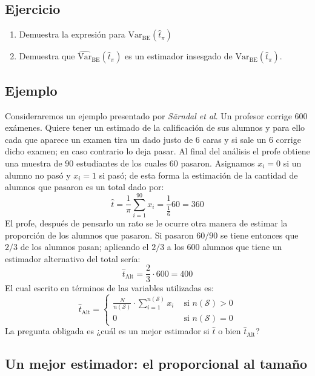 \documentclass[
]{book}
\begin{document}
\hypertarget{ejercicio-8}{%
\subsection{Ejercicio}\label{ejercicio-8}}

\begin{enumerate}
\def\labelenumi{\arabic{enumi}.}
\item
  Demuestra la expresión para \(\textrm{Var}_{\text{BE}}(\hat{t}_{\pi})\)
\item
  Demuestra que \(\widehat{\textrm{Var}}_{\text{BE}}(\hat{t}_{\pi})\) es un estimador insesgado de \(\textrm{Var}_{\text{BE}}(\hat{t}_{\pi})\).
\end{enumerate}

\hypertarget{ejemplo-1}{%
\subsection{Ejemplo}\label{ejemplo-1}}

Consideraremos un ejemplo presentado por \emph{Särndal et al}. Un profesor corrige 600 exámenes. Quiere tener un estimado de la calificación de sus alumnos y para ello cada que aparece un examen tira un dado justo de \(6\) caras y si sale un \(6\) corrige dicho examen; en caso contrario lo deja pasar. Al final del análisis el profe obtiene una muestra de \(90\) estudiantes de los cuales \(60\) pasaron. Asignamos \(x_i = 0\) si un alumno no pasó y \(x_i = 1\) si pasó; de esta forma la estimación de la cantidad de alumnos que pasaron es un total dado por:
\[
\hat{t} = \frac{1}{\pi} \sum\limits_{i = 1}^{90} x_i = \dfrac{1}{\frac{1}{6}} 60 = 360
\]
El profe, después de pensarlo un rato se le ocurre otra manera de estimar la proporción de los alumnos que pasaron. Si pasaron \(60/90\) se tiene entonces que \(2/3\) de los alumnos pasan; aplicando el \(2/3\) a los \(600\) alumnos que tiene un estimador alternativo del total sería:
\[
\hat{t}_{\text{Alt}} = \dfrac{2}{3}\cdot 600 = 400
\]
El cual escrito en términos de las variables utilizadas es:
\[
\hat{t}_{\text{Alt}} = \begin{cases}
\frac{N}{n(\mathcal{S})} \cdot \sum\limits_{i = 1}^{n(\mathcal{S})} x_i & \text{ si } n(\mathcal{S}) > 0 \\
0 & \text{ si } n(\mathcal{S}) = 0
\end{cases}
\]
La pregunta obligada es ¿cuál es un mejor estimador si \(\hat{t}\) o bien \(\hat{t}_{\text{Alt}}\)?

\hypertarget{un-mejor-estimador-el-proporcional-al-tamauxf1o}{%
\subsection{Un mejor estimador: el proporcional al tamaño}\label{un-mejor-estimador-el-proporcional-al-tamauxf1o}}
\end{document}
